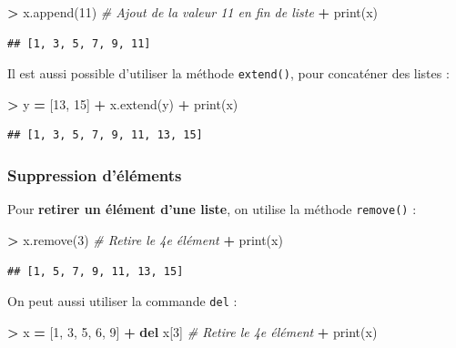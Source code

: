 \documentclass[12pt,]{book}
\newenvironment{Shaded}{\begin{snugshade}}{\end{snugshade}}
\newcommand{\KeywordTok}[1]{\textcolor[rgb]{0.13,0.29,0.53}{\textbf{#1}}}
\newcommand{\DecValTok}[1]{\textcolor[rgb]{0.00,0.00,0.81}{#1}}
\newcommand{\CommentTok}[1]{\textcolor[rgb]{0.56,0.35,0.01}{\textit{#1}}}
\newcommand{\OperatorTok}[1]{\textcolor[rgb]{0.81,0.36,0.00}{\textbf{#1}}}
\newcommand{\BuiltInTok}[1]{#1}
\newcommand{\NormalTok}[1]{#1}
\numberwithin{equation}{section}
\numberwithin{countremarque}{section}
\begin{document}
\begin{Shaded}
\begin{Highlighting}[]
\OperatorTok{>}\NormalTok{ x.append(}\DecValTok{11}\NormalTok{) }\CommentTok{# Ajout de la valeur 11 en fin de liste}
\OperatorTok{+} \BuiltInTok{print}\NormalTok{(x)}
\end{Highlighting}
\end{Shaded}

\begin{lstlisting}
## [1, 3, 5, 7, 9, 11]
\end{lstlisting}

Il est aussi possible d'utiliser la méthode \texttt{extend()}, pour
concaténer des listes :

\begin{Shaded}
\begin{Highlighting}[]
\OperatorTok{>}\NormalTok{ y }\OperatorTok{=}\NormalTok{ [}\DecValTok{13}\NormalTok{, }\DecValTok{15}\NormalTok{]}
\OperatorTok{+}\NormalTok{ x.extend(y)}
\OperatorTok{+} \BuiltInTok{print}\NormalTok{(x)}
\end{Highlighting}
\end{Shaded}

\begin{lstlisting}
## [1, 3, 5, 7, 9, 11, 13, 15]
\end{lstlisting}

\subsubsection{Suppression d'éléments}\label{suppression-delements}

Pour \textbf{retirer un élément d'une liste}, on utilise la méthode
\texttt{remove()} :

\begin{Shaded}
\begin{Highlighting}[]
\OperatorTok{>}\NormalTok{ x.remove(}\DecValTok{3}\NormalTok{) }\CommentTok{# Retire le 4e élément}
\OperatorTok{+} \BuiltInTok{print}\NormalTok{(x)}
\end{Highlighting}
\end{Shaded}

\begin{lstlisting}
## [1, 5, 7, 9, 11, 13, 15]
\end{lstlisting}

On peut aussi utiliser la commande \texttt{del} :

\begin{Shaded}
\begin{Highlighting}[]
\OperatorTok{>}\NormalTok{ x }\OperatorTok{=}\NormalTok{ [}\DecValTok{1}\NormalTok{, }\DecValTok{3}\NormalTok{, }\DecValTok{5}\NormalTok{, }\DecValTok{6}\NormalTok{, }\DecValTok{9}\NormalTok{]}
\OperatorTok{+} \KeywordTok{del}\NormalTok{ x[}\DecValTok{3}\NormalTok{] }\CommentTok{# Retire le 4e élément}
\OperatorTok{+} \BuiltInTok{print}\NormalTok{(x)}
\end{Highlighting}
\end{Shaded}
\end{document}
